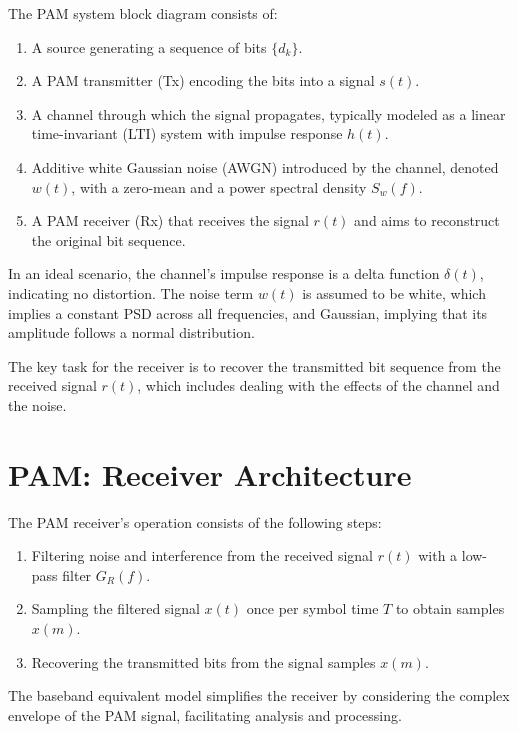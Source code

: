 The PAM system block diagram consists of:
\begin{enumerate}
    \item A source generating a sequence of bits \( \{d_k\} \).
    \item A PAM transmitter (Tx) encoding the bits into a signal \( s(t) \).
    \item A channel through which the signal propagates, typically modeled as a linear time-invariant (LTI) system with impulse response \( h(t) \).
    \item Additive white Gaussian noise (AWGN) introduced by the channel, denoted \( w(t) \), with a zero-mean and a power spectral density \( S_w(f) \).
    \item A PAM receiver (Rx) that receives the signal \( r(t) \) and aims to reconstruct the original bit sequence.
\end{enumerate}

In an ideal scenario, the channel's impulse response is a delta function \( \delta(t) \), indicating no distortion. The noise term \( w(t) \) is assumed to be white, which implies a constant PSD across all frequencies, and Gaussian, implying that its amplitude follows a normal distribution.

The key task for the receiver is to recover the transmitted bit sequence from the received signal \( r(t) \), which includes dealing with the effects of the channel and the noise.


\section*{PAM: Receiver Architecture}

The PAM receiver's operation consists of the following steps:
\begin{enumerate}
    \item Filtering noise and interference from the received signal \( r(t) \) with a low-pass filter \( G_R(f) \).
    \item Sampling the filtered signal \( x(t) \) once per symbol time \( T \) to obtain samples \( x(m) \).
    \item Recovering the transmitted bits from the signal samples \( x(m) \).
\end{enumerate}

The baseband equivalent model simplifies the receiver by considering the complex envelope of the PAM signal, facilitating analysis and processing.

